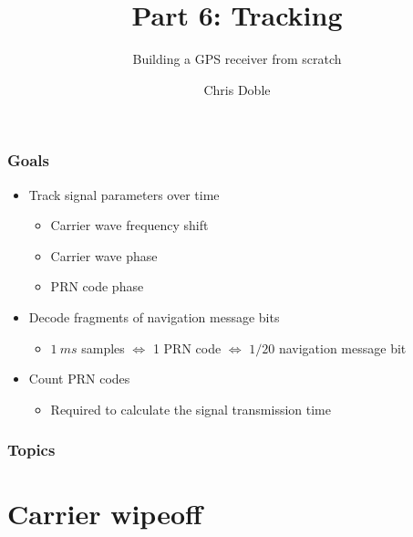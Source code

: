 \documentclass[aspectratio=169]{beamer}
\author{Chris Doble}
\date{}
\subtitle{Building a GPS receiver from scratch}
\title{Part 6: Tracking}
\begin{document}
\frame{\titlepage}

\begin{frame}
    \frametitle{Goals}

    \begin{itemize}
        \item<2-> Track signal parameters over time
        
        \begin{itemize}
            \item<3-> Carrier wave frequency shift
            
            \item<4-> Carrier wave phase
            
            \item<5-> PRN code phase
        \end{itemize}

        \item<6-> Decode fragments of navigation message bits
        
        \begin{itemize}
            \item<7-> $\qty{1}{ms}$ samples $\Leftrightarrow$ 1 PRN code $\Leftrightarrow$ $1/20$ navigation message bit
        \end{itemize}

        \item<8-> Count PRN codes
        
        \begin{itemize}
            \item<9-> Required to calculate the signal transmission time
        \end{itemize}
    \end{itemize}
\end{frame}

\begin{frame}
    \frametitle{Topics}

    \tableofcontents
\end{frame}

\section{Carrier wipeoff}
\end{document}
